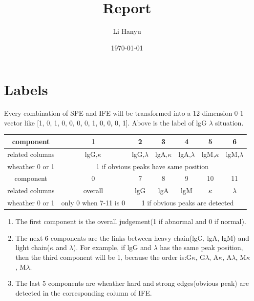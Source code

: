 \documentclass[12pt]{ctexart}
\title{Report}
\author{Li Hanyu}
\date{\today}
\begin{document}
\maketitle
\newpage
\section{Labels}
\par Every combination of SPE and IFE will be transformed into a 12-dimension 0-1 vector like [1, 0, 1, 0, 0, 0, 0, 1, 0, 0, 0, 1]. Above is the label of lgG $\lambda$ situation.

\begin{tabular}{|c|c|c|c|c|c|c|}
    \hline
    component&1&2&3&4&5&6\\
    \hline
    related columns&lgG,$\kappa$&lgG,$\lambda$&lgA,$\kappa$&lgA,$\lambda$&lgM,$\kappa$&lgM,$\lambda$\\
    \hline
    wheather 0 or 1&\multicolumn{6}{|c|}{1 if obvious peaks have same position}\\
    \hline
    \hline
    component&0&7&8&9&10&11\\
    \hline
    related columns&overall&lgG&lgA&lgM&$\kappa$&$\lambda$\\
    \hline
    wheather 0 or 1&only 0 when 7-11 is 0&\multicolumn{5}{|c|}{1 if obvious peaks are detected}\\
    \hline
    \end{tabular}
\begin{enumerate}
    \item The first component is the overall judgement(1 if abnormal and 0 if normal).
    \item The next 6 components are the links between heavy chain(lgG, lgA, lgM) and light chain($\kappa$ and $\lambda$). For example, if lgG and $\lambda$ has the same peak position, then the third component will be 1, because the order is:G$\kappa$, G$\lambda$, A$\kappa$, A$\lambda$, M$\kappa$, M$\lambda$.
    \item The last 5 components are wheather hard and strong edges(obvious peak) are detected in the corresponding column of IFE.
\end{enumerate}
\end{document}
